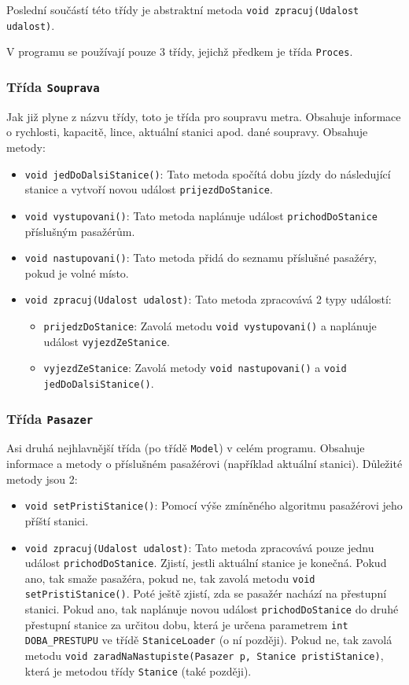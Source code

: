 \documentclass[12pt, a4paper]{article}
\begin{document}
Poslední součástí této třídy je abstraktní metoda \texttt{void zpracuj(Udalost udalost)}.

V programu se používají pouze 3 třídy, jejichž předkem je třída \texttt{Proces}.

\subsubsection{Třída \texttt{Souprava}}
Jak již plyne z názvu třídy, toto je třída pro soupravu metra. Obsahuje informace o rychlosti, kapacitě, lince, aktuální stanici apod. dané soupravy. Obsahuje metody:
\begin{itemize}
    \item \texttt{void jedDoDalsiStanice()}: Tato metoda spočítá dobu jízdy do následující stanice a vytvoří novou událost \texttt{prijezdDoStanice}.
    \item \texttt{void vystupovani()}: Tato metoda naplánuje událost \texttt{prichodDoStanice} příslušným pasažérům.
    \item \texttt{void nastupovani()}: Tato metoda přidá do seznamu příslušné pasažéry, pokud je volné místo.
    \item \texttt{void zpracuj(Udalost udalost)}: Tato metoda zpracovává 2 typy událostí:
    \begin{itemize}
        \item \texttt{prijedzDoStanice}: Zavolá metodu \texttt{void vystupovani()} a naplánuje událost \texttt{vyjezdZeStanice}.
        \item \texttt{vyjezdZeStanice}: Zavolá metody \texttt{void nastupovani()} a \texttt{void jedDoDalsiStanice()}.
    \end{itemize}
\end{itemize}

\subsubsection{Třída \texttt{Pasazer}}
Asi druhá nejhlavnější třída (po třídě \texttt{Model}) v celém programu. Obsahuje informace a metody o příslušném pasažérovi (například aktuální stanici). Důležité metody jsou 2:
\begin{itemize}
    \item \texttt{void setPristiStanice()}: Pomocí výše zmíněného algoritmu  pasažérovi jeho příští stanici.
    \item \texttt{void zpracuj(Udalost udalost)}: Tato metoda zpracovává pouze jednu událost \texttt{prichodDoStanice}. Zjistí, jestli aktuální stanice je konečná. Pokud ano, tak smaže pasažéra, pokud ne, tak zavolá metodu \texttt{void setPristiStanice()}. Poté ještě zjistí, zda se pasažér nachází na přestupní stanici. Pokud ano, tak naplánuje novou událost \texttt{prichodDoStanice} do druhé přestupní stanice za určitou dobu, která je určena parametrem \texttt{int DOBA\_PRESTUPU} ve třídě \texttt{StaniceLoader} (o ní později). Pokud ne, tak zavolá metodu \texttt{void zaradNaNastupiste(Pasazer p, Stanice pristiStanice)}, která je metodou třídy \texttt{Stanice} (také později).
\end{itemize}
\end{document}
